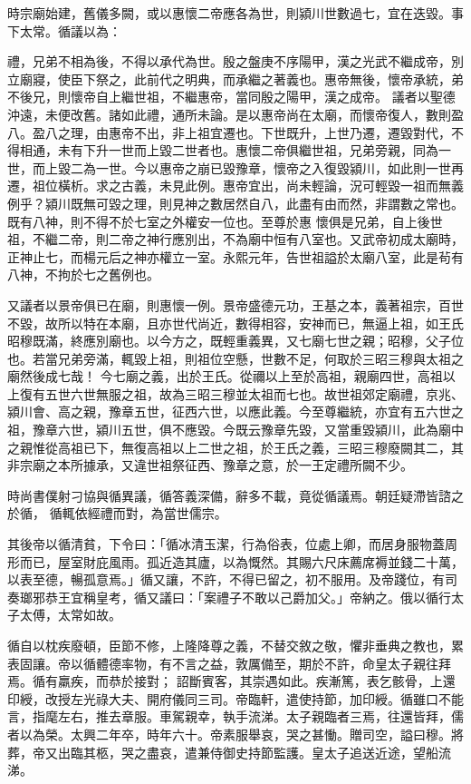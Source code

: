 \begin{pinyinscope}
 時宗廟始建，舊儀多闕，或以惠懷二帝應各為世，則潁川世數過七，宜在迭毀。事下太常。循議以為：



 禮，兄弟不相為後，不得以承代為世。殷之盤庚不序陽甲，漢之光武不繼成帝，別立廟寢，使臣下祭之，此前代之明典，而承繼之著義也。惠帝無後，懷帝承統，弟不後兄，則懷帝自上繼世祖，不繼惠帝，當同殷之陽甲，漢之成帝。
 議者以聖德沖遠，未便改舊。諸如此禮，通所未論。是以惠帝尚在太廟，而懷帝復人，數則盈八。盈八之理，由惠帝不出，非上祖宜遷也。下世既升，上世乃遷，遷毀對代，不得相通，未有下升一世而上毀二世者也。惠懷二帝俱繼世祖，兄弟旁親，同為一世，而上毀二為一世。今以惠帝之崩已毀豫章，懷帝之入復毀潁川，如此則一世再遷，祖位橫析。求之古義，未見此例。惠帝宜出，尚未輕論，況可輕毀一祖而無義例乎？潁川既無可毀之理，則見神之數居然自八，此盡有由而然，非謂數之常也。既有八神，則不得不於七室之外權安一位也。至尊於惠
 懷俱是兄弟，自上後世祖，不繼二帝，則二帝之神行應別出，不為廟中恒有八室也。又武帝初成太廟時，正神止七，而楊元后之神亦權立一室。永熙元年，告世祖謚於太廟八室，此是茍有八神，不拘於七之舊例也。



 又議者以景帝俱已在廟，則惠懷一例。景帝盛德元功，王基之本，義著祖宗，百世不毀，故所以特在本廟，且亦世代尚近，數得相容，安神而已，無逼上祖，如王氏昭穆既滿，終應別廟也。以今方之，既輕重義異，又七廟七世之親；昭穆，父子位也。若當兄弟旁滿，輒毀上祖，則祖位空懸，世數不足，何取於三昭三穆與太祖之廟然後成七哉！
 今七廟之義，出於王氏。從禰以上至於高祖，親廟四世，高祖以上復有五世六世無服之祖，故為三昭三穆並太祖而七也。故世祖郊定廟禮，京兆、潁川會、高之親，豫章五世，征西六世，以應此義。今至尊繼統，亦宜有五六世之祖，豫章六世，潁川五世，俱不應毀。今既云豫章先毀，又當重毀潁川，此為廟中之親惟從高祖已下，無復高祖以上二世之祖，於王氏之義，三昭三穆廢闕其二，其非宗廟之本所據承，又違世祖祭征西、豫章之意，於一王定禮所闕不少。



 時尚書僕射刁協與循異議，循答義深備，辭多不載，竟從循議焉。朝廷疑滯皆諮之於循，
 循輒依經禮而對，為當世儒宗。



 其後帝以循清貧，下令曰：「循冰清玉潔，行為俗表，位處上卿，而居身服物蓋周形而已，屋室財庇風雨。孤近造其廬，以為慨然。其賜六尺床薦席褥並錢二十萬，以表至德，暢孤意焉。」循又讓，不許，不得已留之，初不服用。及帝踐位，有司奏瑯邪恭王宜稱皇考，循又議曰：「案禮子不敢以己爵加父。」帝納之。俄以循行太子太傅，太常如故。



 循自以枕疾廢頓，臣節不修，上隆降尊之義，不替交敘之敬，懼非垂典之教也，累表固讓。帝以循體德率物，有不言之益，敦厲備至，期於不許，命皇太子親往拜焉。循有羸疾，而恭於接對；
 詔斷賓客，其崇遇如此。疾漸篤，表乞骸骨，上還印綬，改授左光祿大夫、開府儀同三司。帝臨軒，遣使持節，加印綬。循雖口不能言，指麾左右，推去章服。車駕親幸，執手流涕。太子親臨者三焉，往還皆拜，儒者以為榮。太興二年卒，時年六十。帝素服舉哀，哭之甚慟。贈司空，謚曰穆。將葬，帝又出臨其柩，哭之盡哀，遣兼侍御史持節監護。皇太子追送近途，望船流涕。




\end{pinyinscope}
